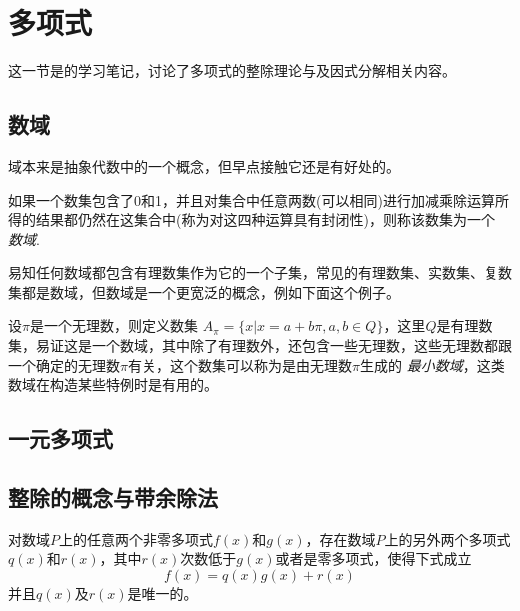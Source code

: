 
\section{多项式}
\label{sec:polynome}

这一节是\cite{advanced-algebra}的学习笔记，讨论了多项式的整除理论与及因式分解相关内容。

\subsection{数域}
\label{sec:number-field}

域本来是抽象代数中的一个概念，但早点接触它还是有好处的。

\begin{definition}
  如果一个数集包含了0和1，并且对集合中任意两数(可以相同)进行加减乘除运算所得的结果都仍然在这集合中(称为对这四种运算具有封闭性)，则称该数集为一个 \emph{数域}.
\end{definition}

易知任何数域都包含有理数集作为它的一个子集，常见的有理数集、实数集、复数集都是数域，但数域是一个更宽泛的概念，例如下面这个例子。

\begin{example}
  设$\pi$是一个无理数，则定义数集 $A_{\pi} = \{x|x=a+b\pi,a,b\in Q\}$，这里$Q$是有理数集，易证这是一个数域，其中除了有理数外，还包含一些无理数，这些无理数都跟一个确定的无理数$\pi$有关，这个数集可以称为是由无理数$\pi$生成的 \emph{最小数域}，这类数域在构造某些特例时是有用的。
\end{example}

\subsection{一元多项式}
\label{sec:polynome-with-one-variable}



\subsection{整除的概念与带余除法}
\label{sec:polynome-integer-division-and-devision-with-remainder}

\begin{theorem}[带余除法]
  对数域$P$上的任意两个非零多项式$f(x)$和$g(x)$，存在数域$P$上的另外两个多项式$q(x)$和$r(x)$，其中$r(x)$次数低于$g(x)$或者是零多项式，使得下式成立
  \[ f(x) = q(x) g(x) + r(x) \]
  并且$q(x)$及$r(x)$是唯一的。
\end{theorem}

